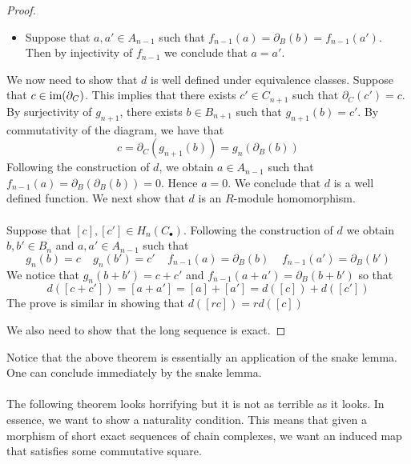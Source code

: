 \documentclass[a4paper]{article}
\begin{document}
\begin{thm}{}{}
\begin{proof}
\begin{itemize}
\item Suppose that $a,a'\in A_{n-1}$ such that $f_{n-1}(a)=\partial_B(b)=f_{n-1}(a')$. Then by injectivity of $f_{n-1}$ we conclude that $a=a'$. 
\end{itemize}
We now need to show that $d$ is well defined under equivalence classes. Suppose that $c\in\operatorname{im}(\partial_C)$. This implies that there exists $c'\in C_{n+1}$ such that $\partial_C(c')=c$. By surjectivity of $g_{n+1}$, there exists $b\in B_{n+1}$ such that $g_{n+1}(b)=c'$. By commutativity of the diagram, we have that $$c=\partial_C(g_{n+1}(b))=g_n(\partial_B(b))$$ Following the construction of $d$, we obtain $a\in A_{n-1}$ such that $f_{n-1}(a)=\partial_B(\partial_B(b))=0$. Hence $a=0$. We conclude that $d$ is a well defined function. We next show that $d$ is an $R$-module homomorphism. \\~\\

Suppose that $[c],[c']\in H_n(C_\bullet)$. Following the construction of $d$ we obtain $b,b'\in B_n$ and $a,a'\in A_{n-1}$ such that $$g_n(b)=c\;\;\;\;g_n(b')=c'\;\;\;\;f_{n-1}(a)=\partial_B(b)\;\;\;\;f_{n-1}(a')=\partial_B(b')$$ We notice that $g_n(b+b')=c+c'$ and $f_{n-1}(a+a')=\partial_B(b+b')$ so that $$d([c+c'])=[a+a']=[a]+[a']=d([c])+d([c'])$$ The prove is similar in showing that $d([rc])=rd([c])$

We also need to show that the long sequence is exact. 
\end{proof}
\end{thm}

Notice that the above theorem is essentially an application of the snake lemma. One can conclude immediately by the snake lemma. \\~\\

The following theorem looks horrifying but it is not as terrible as it looks. In essence, we want to show a naturality condition. This means that given a morphism of short exact sequences of chain complexes, we want an induced map that satisfies some commutative square. 
\end{document}
